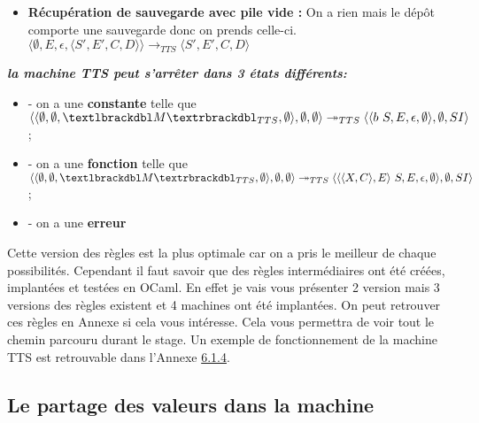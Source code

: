 \documentclass[10pt,a4paper]{article}
\begin{document}
\begin{enumerate}
\begin{itemize}
				        \item[] \textbf{Récupération de sauvegarde avec pile vide :}  On a rien mais le dépôt comporte une sauvegarde donc on prends celle-ci.
						\smallbreak  
						$\langle \emptyset,E,\epsilon,\langle S',E',C,D\rangle\rangle
						\longrightarrow_{TTS} 
						\langle S',E',C,D\rangle$
					\end{itemize}
				\end{enumerate}
				\bigbreak
				\bigbreak
					
					
					
					
				\textbf{\textit{la machine TTS peut s'arrêter dans 3 états différents:}}
				\smallbreak
				\begin{itemize}
					\item[] - on a une \textbf{constante} telle que 
					$\langle\langle \emptyset,\emptyset,\textlbrackdbl M\textrbrackdbl_{TTS},\emptyset\rangle,\emptyset,\emptyset\rangle 
					\twoheadrightarrow_{TTS} 
					\langle\langle b~S,E,\epsilon,\emptyset\rangle,\emptyset,SI\rangle$;
				    
				    \item[] - on a une \textbf{fonction} telle que
					$\langle\langle \emptyset,\emptyset,\textlbrackdbl M\textrbrackdbl_{TTS},\emptyset\rangle,\emptyset,\emptyset\rangle 
					\twoheadrightarrow_{TTS} 
					\langle\langle\langle X,C\rangle,E\rangle~S,E,\epsilon,\emptyset\rangle,\emptyset,SI\rangle$;
			
					\item[] - on a une \textbf{erreur} 
				\end{itemize}
				\bigbreak
				\bigbreak
					
					
					
					
				Cette version des règles est la plus optimale car on a pris le meilleur de chaque possibilités. Cependant il faut savoir que des règles intermédiaires ont été créées, implantées et testées en OCaml. En effet je vais vous présenter 2 version mais 3 versions des règles existent et 4 machines ont été implantées. On peut retrouver ces règles en Annexe si cela vous intéresse. Cela vous permettra de voir tout le chemin parcouru durant le stage. Un exemple de fonctionnement de la machine TTS est retrouvable dans l'Annexe \hyperref[TTS]{6.1.4}.
				\newpage
					
					
		\subsection{Le partage des valeurs dans la machine}
			
\end{document}
